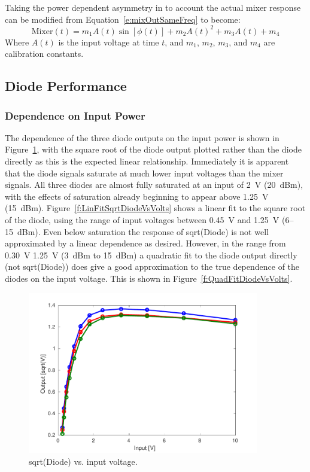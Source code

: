 Taking the power dependent asymmetry in to account the actual mixer response can be modified from Equation~\ref{e:mixOutSameFreq} to become:
\begin{equation}
\mathrm{Mixer}(t) = m_1A(t)\sin[\phi(t)] + m_2A(t)^2 + m_3A(t) + m_4
\label{e:actualMixerResponse}
\end{equation}
Where \(A(t)\) is the input voltage at time \(t\), and \(m_1\), \(m_2\), \(m_3\), and \(m_4\) are calibration constants.

\subsection{Diode Performance}
\label{ss:sigGenDiode}

\subsubsection{Dependence on Input Power}

The dependence of the three diode outputs on the input power is shown in Figure~\ref{f:SqrtDiodeVsVolts}, with the square root of the diode output plotted rather than the diode directly as this is the expected linear relationship. Immediately it is apparent that the diode signals saturate at much lower input voltages than the mixer signals. All three diodes are almost fully saturated at an input of 2~V (20~dBm), with the effects of saturation already beginning to appear above 1.25~V (15~dBm). Figure~\ref{f:LinFitSqrtDiodeVsVolts} shows a linear fit to the square root of the diode, using the range of input voltages between 0.45~V and 1.25~V (6--15~dBm). Even below saturation the response of sqrt(Diode) is not well approximated by a linear dependence as desired. However, in the range from 0.30~V 1.25~V (3~dBm to 15~dBm) a quadratic fit to the diode output directly (not sqrt(Diode)) does give a good approximation to the true dependence of the diodes on the input voltage. This is shown in Figure~\ref{f:QuadFitDiodeVsVolts}.

\begin{figure}
  \centering
  \includegraphics[width=0.9\textwidth]{Figures/phaseMons/SqrtDiodeVsVolts}
  \caption{sqrt(Diode) vs. input voltage.}
  \label{f:SqrtDiodeVsVolts}
\end{figure}

